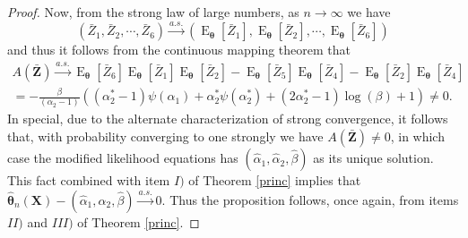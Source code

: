 \documentclass[12pt]{article} %
\newcommand{\bs}{\boldsymbol}
\newcommand{\on}{\operatorname}
\theoremstyle{definition}
\begin{document}
\begin{proof}
 Now, from the strong law of large numbers, as $n\to \infty$ we have
\begin{equation*}
\left(\bar{Z}_1,\bar{Z}_2,\cdots,\bar{Z}_6\right)\overset{a.s.}{\to}\left(\on{E}_{\bs{\theta}}\left[\bar{Z}_1\right],\on{E}_{\bs{\theta}}\left[\bar{Z}_2\right],\cdots,\on{E}_{\bs{\theta}}\left[\bar{Z}_6\right]\right)
\end{equation*}
and thus it follows from the continuous mapping theorem that
\begin{equation*}
\begin{aligned}
A(\bs{\bar{Z}})\overset{a.s.}{\to} \on{E}_{\bs{\theta}}\left[\bar{Z}_6\right]\on{E}_{\bs{\theta}}\left[\bar{Z}_1\right]\on{E}_{\bs{\theta}}\left[\bar{Z}_2\right] - \on{E}_{\bs{\theta}}\left[\bar{Z}_5\right]\on{E}_{\bs{\theta}}\left[\bar{Z}_4\right] - \on{E}_{\bs{\theta}}\left[\bar{Z}_2\right]\on{E}_{\bs{\theta}}\left[\bar{Z}_4\right]\\
= -\frac{\beta}{(\alpha_2-1)}\left((\alpha_2^*-1)\psi(\alpha_1) + \alpha_2^*\psi(\alpha_2^*) + (2\alpha_2^*-1)\log(\beta) + 1\right)\neq 0.
\end{aligned}
\end{equation*}
In special, due to the alternate characterization of strong convergence, it follows that, with probability converging to one strongly we have $A(\bs{\bar{Z}})\neq 0$, in which case the modified likelihood equations has $(\hat\alpha_1,\hat\alpha_2,\hat\beta)$ as its unique solution. This fact combined with item $I)$ of Theorem \ref{princ} implies that $\bs{\hat{\theta}}_n(\bs{X})-(\hat\alpha_1,\hat\alpha_2,\hat\beta)\overset{a.s.}{\to} 0$. Thus the proposition follows, once again, from items $II)$ and $III)$ of Theorem \ref{princ}.
\end{proof}



\end{document}
